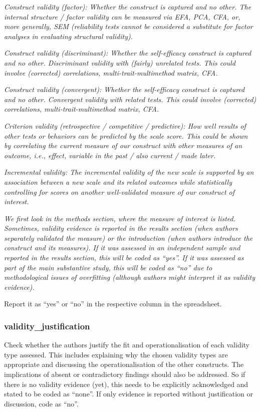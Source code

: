 {\textit{Construct validity (factor): Whether the construct is captured and no other. The internal structure / factor validity can be measured via EFA, PCA, CFA, or, more generally, SEM (reliability tests cannot be considered a substitute for factor analyses in evaluating structural validity).}

\textit{Construct validity (discriminant): Whether the self-efficacy construct is captured and no other. Discriminant validity with (fairly) unrelated tests. This could involve (corrected) correlations, multi-trait-multimethod matrix, CFA.}

\textit{Construct validity (convergent): Whether the self-efficacy construct is captured and no other. Convergent validity with related tests. This could involve (corrected) correlations, multi-trait-multimethod matrix, CFA.}

\textit{Criterion validity (retrospective / competitive / predictive): How well results of other tests or behaviors can be predicted by the scale score. This could be shown by correlating the current measure of our construct with other measures of an outcome, i.e., effect, variable in the past / also current / made later.}

\textit{Incremental validity: The incremental validity of the new scale is supported by an association between a new scale and its related outcomes while statistically controlling for scores on another well-validated measure of our construct of interest.}

\textit{We first look in the methods section, where the measure of interest is listed. Sometimes, validity evidence is reported in the results section (when authors separately validated the measure) or the introduction (when authors introduce the construct and its measures). If it was assessed in an independent sample and reported in the results section, this will be coded as ``yes''. If it was assessed as part of the main substantive study, this will be coded as ``no'' due to methodological issues of overfitting (although authors might interpret it as validity evidence).}

Report it as ``yes'' or ``no'' in the respective column in the spreadsheet.

\subsubsection*{validity\_justification}
\label{validjustify}
Check whether the authors justify the fit and operationalisation of each validity type assessed. This includes explaining why the chosen validity types are appropriate and discussing the operationalisation of the other constructs. The implications of absent or contradictory findings should also be addressed. So if there is no validity evidence (yet), this needs to be explicitly acknowledged and stated to be coded as ``none''. If only evidence is reported without justification or discussion, code as ``no''. 

}
